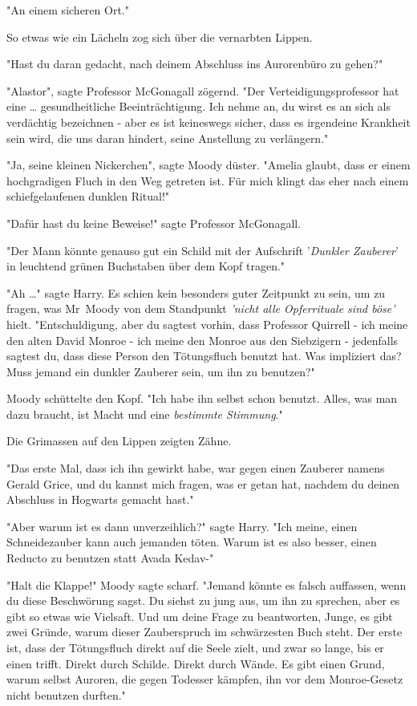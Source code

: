 {"An einem sicheren Ort."

So etwas wie ein Lächeln zog sich über die vernarbten Lippen.

"Hast du daran gedacht, nach deinem Abschluss ins Aurorenbüro zu gehen?"

"Alastor", sagte Professor McGonagall zögernd. "Der Verteidigungsprofessor hat eine … gesundheitliche Beeinträchtigung. Ich nehme an, du wirst es an sich als verdächtig bezeichnen - aber es ist keineswegs sicher, dass es irgendeine Krankheit sein wird, die uns daran hindert, seine Anstellung zu verlängern."

"Ja, seine kleinen Nickerchen", sagte Moody düster. "Amelia glaubt, dass er einem hochgradigen Fluch in den Weg getreten ist. Für mich klingt das eher nach einem schiefgelaufenen dunklen Ritual!"

"Dafür hast du keine Beweise!" sagte Professor McGonagall.

"Der Mann könnte genauso gut ein Schild mit der Aufschrift '\emph{Dunkler Zauberer}' in leuchtend grünen Buchstaben über dem Kopf tragen."

"Ah …" sagte Harry. Es schien kein besonders guter Zeitpunkt zu sein, um zu fragen, was Mr~Moody von dem Standpunkt \emph{'nicht alle Opferrituale sind böse'} hielt. "Entschuldigung, aber du sagtest vorhin, dass Professor Quirrell - ich meine den alten David Monroe - ich meine den Monroe aus den Siebzigern - jedenfalls sagtest du, dass diese Person den Tötungsfluch benutzt hat. Was impliziert das? Muss jemand ein dunkler Zauberer sein, um ihn zu benutzen?"

Moody schüttelte den Kopf. "Ich habe ihn selbst schon benutzt. Alles, was man dazu braucht, ist Macht und eine \emph{bestimmte Stimmung}."

Die Grimassen auf den Lippen zeigten Zähne.

"Das erste Mal, dass ich ihn gewirkt habe, war gegen einen Zauberer namens Gerald Grice, und du kannst mich fragen, was er getan hat, nachdem du deinen Abschluss in Hogwarts gemacht hast."

"Aber warum ist es dann unverzeihlich?" sagte Harry. "Ich meine, einen Schneidezauber kann auch jemanden töten. Warum ist es also besser, einen Reducto zu benutzen statt Avada Kedav-"

"Halt die Klappe!" Moody sagte scharf. "Jemand könnte es falsch auffassen, wenn du diese Beschwörung sagst. Du siehst zu jung aus, um ihn zu sprechen, aber es gibt so etwas wie Vielsaft. Und um deine Frage zu beantworten, Junge, es gibt zwei Gründe, warum dieser Zauberspruch im schwärzesten Buch steht. Der erste ist, dass der Tötungsfluch direkt auf die Seele zielt, und zwar so lange, bis er einen trifft. Direkt durch Schilde. Direkt durch Wände. Es gibt einen Grund, warum selbst Auroren, die gegen Todesser kämpfen, ihn vor dem Monroe-Gesetz nicht benutzen durften."

}
